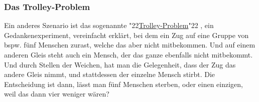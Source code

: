 \documentclass[10pt,a5paper]{article}
\newcommand{\q}[1]{\char"22{#1}\char"22 }
\begin{document}
	\subsubsection{Das Trolley-Problem}
		Ein anderes Szenario ist das sogenannte \q{\href{https://de.wikipedia.org/wiki/Trolley-Problem}{Trolley-Problem}},
		ein Gedankenexperiment,
		vereinfacht erkl\"art,
		bei dem ein Zug auf eine Gruppe von bspw. f\"unf Menschen zurast,
		welche das aber nicht mitbekommen.
		Und auf einem anderen Gleis steht auch ein Mensch,
		der das ganze ebenfalls nicht mitbekommt.
		Und durch Stellen der Weichen,
		hat man die Gelegenheit,
		dass der Zug das andere Gleis nimmt,
		und stattdessen der einzelne Mensch stirbt.
		Die Entscheidung ist dann,
		l\"asst man f\"unf Menschen sterben,
		oder einen einzigen,
		weil das dann vier weniger w\"aren?
		
\end{document}
